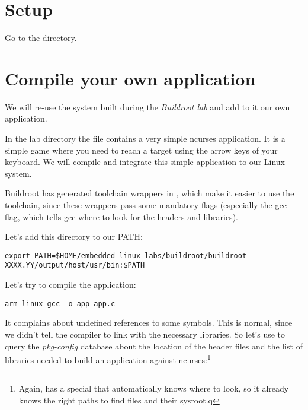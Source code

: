 
\section{Setup}

Go to the  directory.

\section{Compile your own application}

We will re-use the system built during the {\em Buildroot lab} and add
to it our own application.

In the lab directory the file  contains a very simple
ncurses application. It is a simple game where you need to reach a
target using the arrow keys of your keyboard.  We will compile and
integrate this simple application to our Linux system.

Buildroot has generated toolchain wrappers in
, which make it easier to use the toolchain,
since these wrappers pass some mandatory flags (especially the
 gcc flag, which tells gcc where to look for the
headers and libraries).

Let's add this directory to our PATH:

\footnotesize
\begin{verbatim}
export PATH=$HOME/embedded-linux-labs/buildroot/buildroot-XXXX.YY/output/host/usr/bin:$PATH
\end{verbatim}
\normalsize

Let's try to compile the application:

\begin{verbatim}
arm-linux-gcc -o app app.c
\end{verbatim}

It complains about undefined references to some symbols. This is
normal, since we didn't tell the compiler to link with the necessary
libraries. So let's use  to query the {\em
pkg-config} database about the location of the header files and the
list of libraries needed to build an application against
ncurses:\footnote{Again,  has a special
 that automatically knows where to look, so it
already knows the right paths to find  files and their
sysroot.q}

